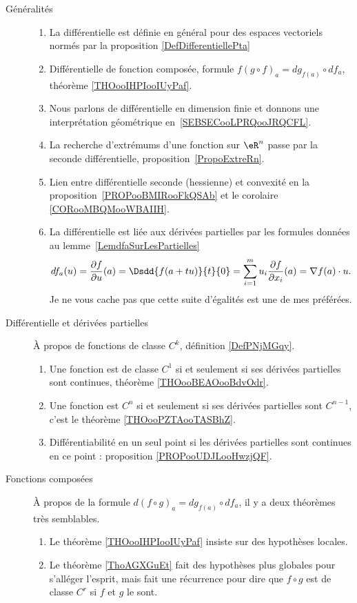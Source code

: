 
\begin{description}
    \item[Généralités] 
\begin{enumerate}
    \item
        La différentielle est définie en général pour des espaces vectoriels normés par la proposition \ref{DefDifferentiellePta}
    \item
        Différentielle de fonction composée, formule \( f(g\circ f)_a=dg_{f(a)}\circ df_a\), théorème \ref{THOooIHPIooIUyPaf}.
    \item
        Nous parlons de différentielle en dimension finie et donnons une interprétation géométrique en~\ref{SEBSECooLPRQooJRQCFL}.
    \item
        La recherche d'extrémums d'une fonction sur \( \eR^n\) passe par la seconde différentielle, proposition~\ref{PropoExtreRn}.
    \item
        Lien entre différentielle seconde (hessienne) et convexité en la proposition~\ref{PROPooBMIRooFkQSAb} et le corolaire \ref{CORooMBQMooWBAIIH}.
    \item
        La différentielle est liée aux dérivées partielles par les formules données au lemme~\ref{LemdfaSurLesPartielles}
	\begin{equation}
        df_a(u)=\frac{ \partial f }{ \partial u }(a)=\Dsdd{ f(a+tu) }{t}{0}=\sum_{i=1}^mu_i\frac{ \partial f }{ \partial x_i }(a)=\nabla f(a)\cdot u.
	\end{equation}
    Je ne vous cache pas que cette suite d'égalités est une de mes préférées.
\end{enumerate}
\item[Différentielle et dérivées partielles]
    À propos de fonctions de classe \( C^k\), définition \ref{DefPNjMGqy}.
    \begin{enumerate}
    \item
        Une fonction est de classe \( C^1\) si et seulement si ses dérivées partielles sont continues, théorème \ref{THOooBEAOooBdvOdr}.
    \item
        Une fonction est \( C^n\) si et seulement si ses dérivées partielles sont \( C^{n-1}\), c'est le théorème \ref{THOooPZTAooTASBhZ}.
    \item
        Différentiabilité en un seul point si les dérivées partielles sont continues en ce point : proposition \ref{PROPooUDJLooHwzjQF}.
    \end{enumerate}
\item[Fonctions composées]
    À propos de la formule \( d(f\circ g)_a=dg_{f(a)}\circ df_a\), il y a deux théorèmes très semblables.
    \begin{enumerate}
        \item
            Le théorème \ref{THOooIHPIooIUyPaf} insiste sur des hypothèses locales.
        \item
            Le théorème \ref{ThoAGXGuEt} fait des hypothèses plus globales pour s'alléger l'esprit, mais fait une récurrence pour dire que \( f\circ g\) est de classe \( C^r\) si \( f\) et \( g\) le sont.
    \end{enumerate}
\end{description}

